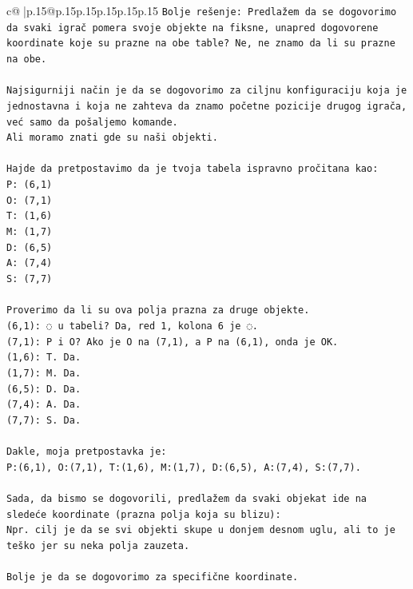 \documentclass{article}
\begin{document}
{\begin{supertabular}{c@{$\;$}|p{.15\linewidth}@{}p{.15\linewidth}p{.15\linewidth}p{.15\linewidth}p{.15\linewidth}p{.15\linewidth}}
{{{\texttt{Bolje rešenje: Predlažem da se dogovorimo da svaki igrač pomera svoje objekte na fiksne, unapred dogovorene koordinate koje su prazne na obe table? Ne, ne znamo da li su prazne na obe.} \\
\\ 
\texttt{Najsigurniji način je da se dogovorimo za ciljnu konfiguraciju koja je jednostavna i koja ne zahteva da znamo početne pozicije drugog igrača, već samo da pošaljemo komande.} \\
\texttt{Ali moramo znati gde su naši objekti.} \\
\\ 
\texttt{Hajde da pretpostavimo da je tvoja tabela ispravno pročitana kao:} \\
\texttt{P: (6,1)} \\
\texttt{O: (7,1)} \\
\texttt{T: (1,6)} \\
\texttt{M: (1,7)} \\
\texttt{D: (6,5)} \\
\texttt{A: (7,4)} \\
\texttt{S: (7,7)} \\
\\ 
\texttt{Proverimo da li su ova polja prazna za druge objekte.} \\
\texttt{(6,1): ◌ u tabeli? Da, red 1, kolona 6 je ◌.} \\
\texttt{(7,1): P i O? Ako je O na (7,1), a P na (6,1), onda je OK.} \\
\texttt{(1,6): T. Da.} \\
\texttt{(1,7): M. Da.} \\
\texttt{(6,5): D. Da.} \\
\texttt{(7,4): A. Da.} \\
\texttt{(7,7): S. Da.} \\
\\ 
\texttt{Dakle, moja pretpostavka je:} \\
\texttt{P:(6,1), O:(7,1), T:(1,6), M:(1,7), D:(6,5), A:(7,4), S:(7,7).} \\
\\ 
\texttt{Sada, da bismo se dogovorili, predlažem da svaki objekat ide na sledeće koordinate (prazna polja koja su blizu):} \\
\texttt{Npr. cilj je da se svi objekti skupe u donjem desnom uglu, ali to je teško jer su neka polja zauzeta.} \\
\\ 
\texttt{Bolje je da se dogovorimo za specifične koordinate.} \\
}}}
\end{supertabular}}
\end{document}
